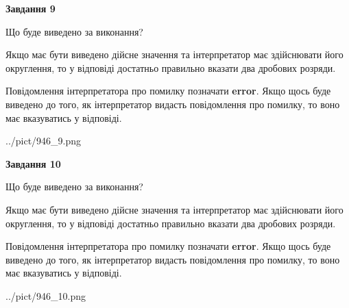 \documentclass[12pt, ukrainian]{article}
\begin{document}
{\begin {Large}
{\begin {center}\textbf{Завдання 9}\end {center}}\par
Що буде виведено за виконання? \par

Якщо має бути виведено дійсне значення та інтерпретатор має здійснювати його округлення, 
то у відповіді достатньо правильно вказати два дробових розряди.

Повідомлення інтерпретатора про помилку позначати \textbf{error}.
Якщо щось буде виведено до того, як інтерпретатор видасть повідомлення про помилку, 
то воно має вказуватись у відповіді. \par

\begin{center}
	{../pict/946_9.png}
\end{center}
\newpage

{\begin {center}\textbf{Завдання 10}\end {center}}\par
Що буде виведено за виконання? \par

Якщо має бути виведено дійсне значення та інтерпретатор має здійснювати його округлення, 
то у відповіді достатньо правильно вказати два дробових розряди.

Повідомлення інтерпретатора про помилку позначати \textbf{error}.
Якщо щось буде виведено до того, як інтерпретатор видасть повідомлення про помилку, 
то воно має вказуватись у відповіді. \par

\begin{center}
	{../pict/946_10.png}
\end{center}
\newpage

\end {Large}}
\end{document}
